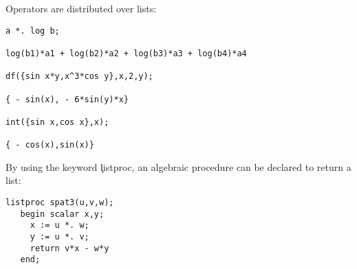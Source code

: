 Operators are distributed over lists:
\begin{verbatim}
a *. log b;

log(b1)*a1 + log(b2)*a2 + log(b3)*a3 + log(b4)*a4

df({sin x*y,x^3*cos y},x,2,y);

{ - sin(x), - 6*sin(y)*x}

int({sin x,cos x},x);

{ - cos(x),sin(x)}
\end{verbatim}
By using the keyword \k{listproc}, an algebraic
procedure can be declared to return a list:
\begin{verbatim}
listproc spat3(u,v,w);
   begin scalar x,y;
     x := u *. w;
     y := u *. v;
     return v*x - w*y
   end;
\end{verbatim}
